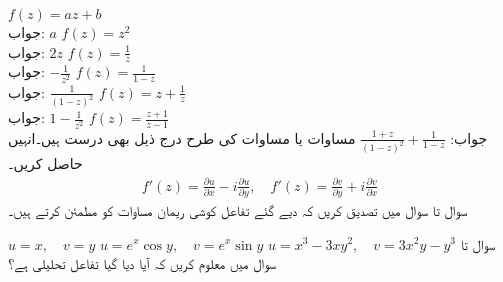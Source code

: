 \quad
$f(z)=az+b$\\
جواب:\quad
$a$
\quad
$f(z)=z^2$\\
جواب:\quad
$2z$
\quad
$f(z)=\tfrac{1}{z}$\\
جواب:\quad
$-\tfrac{1}{z^2}$
\quad
$f(z)=\tfrac{1}{1-z}$\\
جواب:\quad
$\tfrac{1}{(1-z)^2}$
\quad
$f(z)=z+\tfrac{1}{z}$\\
جواب:\quad
$1-\tfrac{1}{z^2}$
\quad
$f(z)=\tfrac{z+1}{z-1}$\\
جواب:\quad
$\tfrac{1+z}{(1-z)^2}+\tfrac{1}{1-z}$
\quad
مساوات  یا مساوات  کی طرح درج ذیل بھی درست ہیں۔انہیں حاصل کریں۔
\begin{align}\label{مساوات_مخلوط_کوشی_ریمان_ثبوت_ٹ}
f'(z)=\frac{\partial u}{\partial x}-i\frac{\partial u}{\partial y},\quad f'(z)=\frac{\partial v}{\partial y}+i\frac{\partial v}{\partial x}
\end{align}
سوال  تا سوال  میں تصدیق کریں کہ دیے گئے تفاعل کوشی ریمان مساوات کو مطمئن کرتے ہیں۔

\quad
$u=x,\quad v=y$
\quad
$u=e^x\cos y,\quad v=e^x\sin y$
\quad
$u=x^3-3xy^2,\quad v=3x^2y-y^3$
سوال  تا سوال  میں معلوم کریں کہ آیا دیا گیا تفاعل تحلیلی ہے؟

